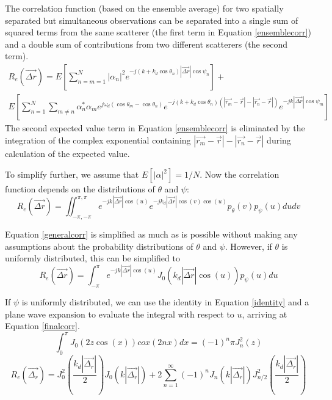 \documentclass[11pt]{article} %
\begin{document}
The correlation function (based on the ensemble average) for two spatially separated but simultaneous observations can be separated into a single sum of squared terms from the same scatterer (the first term in Equation \ref{ensemblecorr}) and a double sum of contributions from two different scatterers (the second term).
\begin{multline}\label{ensemblecorr}
R_e(\vec{\Delta r})= E\left[\sum_{n=m=1}^N |\alpha_n|^2 e^{-j(k+k_d\cos\theta_n)|\vec{\Delta r}|\cos \psi_n}\right] +\\ E\left[\sum_{n=1}^N\sum_{m\neq n} \alpha_n^* \alpha_m e^{j \omega_d (\cos \theta_m - \cos \theta_n)} e^{-j(k+k_d\cos\theta_n)\left(\left|\vec{r_m} - \vec{r}\right|-\left|\vec{r_n} - \vec{r}\right|\right)}e^{-jk\left|\vec{\Delta r}\right| \cos \psi_m}\right]
\end{multline}
The second expected value term in Equation \ref{ensemblecorr} is eliminated by the integration of the complex exponential containing $\left|\vec{r_m} - \vec{r}\right|-\left|\vec{r_n} - \vec{r}\right|$ during calculation of the expected value.  

To simplify further, we assume that $E[|\alpha|^2]=1/N$.  Now the correlation function depends on the distributions of $\theta$ and $\psi$:
\begin{equation}\label{generalcorr}
R_e(\vec{\Delta r})=\iint_{-\pi, -\pi}^{\pi,\pi}e^{-j k |\vec{\Delta r}| \cos(u)} e^{-j k_d |\vec{\Delta r}| \cos (v) \cos(u)} p_{\theta}(v) p_{\psi}(u) du dv
\end{equation}

Equation \ref{generalcorr} is simplified as much as is possible without making any assumptions about the probability distributions of $\theta$ and $\psi$.  However, if $\theta$ is uniformly distributed, this can be simplified to 
\begin{equation}
R_e(\vec{\Delta r})=\int_{-\pi}^{\pi}e^{-j k |\vec{\Delta r}| \cos(u)} J_0(k_d |\vec{\Delta r}| \cos(u))p_{\psi}(u) du 
\end{equation}

If $\psi$ is uniformly distributed, we can use the identity in Equation \ref{identity} \cite{integraltablebook} and a plane wave expansion to evaluate the integral with respect to $u$, arriving at Equation \ref{finalcorr}.
\begin{equation}\label{identity}
\int_0^{\pi} J_0(2z\cos(x))cox(2nx)dx = (-1)^n \pi J_n^2(z)
\end{equation}
\begin{equation}\label{finalcorr}
R_e(\vec{\Delta_r}) = J_0^2(\frac{k_d |\vec{\Delta_r}|}{2})J_0(k|\vec{\Delta_r}|) + 2\sum_{n=1}^{\infty}(-1)^n J_n(k|\vec{\Delta_r}|)J_{n/2}^2(\frac{k_d |\vec{\Delta_r}|}{2})
\end{equation}
\end{document}
